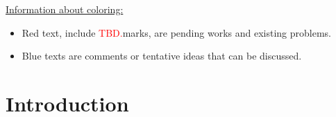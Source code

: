 \documentclass[twoside,12pt,a4paper]{article}
\numberwithin{equation}{section}
\newcommand\TBD{\textcolor{red}{TBD.}}
\begin{document}
	\maketitle

	\setcounter{page}{1} 
	
	\begin{abstract}
		This document is an outline of the article for the Scaling limit of SIRW. We complete the functional CLT in \cite{KMP22} for the asymptotically free self-interacting random walk (AF-SIRW) in the case $0<p \leq \frac{1}{2}$. The approach is to carefully approximate the local drifts of the random walk via the study of the directed edge local times, which are described by branching-like processes and generalized Ray-Knight Theorems. Xiaoyu Liu and Zhe Wang are working on this project. 
		\TBD
	\end{abstract}
	
	\underline{\textsf{Information about coloring:}}
	\begin{itemize}
		\item 
	\textsf{\color{red} Red text, include \TBD marks, are pending works and existing problems.}
		\item 
			\textsf{\color{blue} Blue texts are comments or tentative ideas that can be discussed.}
	\end{itemize}



	\section{Introduction}
	
\end{document}
